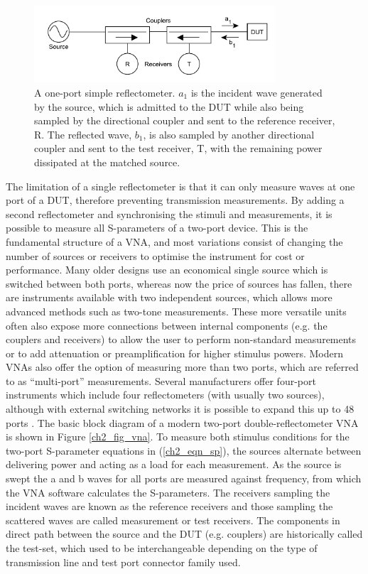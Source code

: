 \documentclass[../thesis/thesis.tex]{subfiles}
\begin{document}
\begin{figure}
	\centering
	\includegraphics[width=0.8\textwidth]{ch2_reflect}
	\caption[Structure of a one-port reflectometer.]{A one-port simple reflectometer. $a_1$ is the incident wave generated by the source, which is admitted to the DUT while also being sampled by the directional coupler and sent to the reference receiver, R. The reflected wave, $b_1$, is also sampled by another directional coupler and sent to the test receiver, T, with the remaining power dissipated at the matched source.}
	\label{ch2_fig_refl}
\end{figure}

The limitation of a single reflectometer is that it can only measure waves at one port of a DUT, therefore preventing transmission measurements. By adding a second reflectometer and synchronising the stimuli and measurements, it is possible to measure all S-parameters of a two-port device. This is the fundamental structure of a VNA, and most variations consist of changing the number of sources or receivers to optimise the instrument for cost or performance. Many older designs use an economical single source which is switched between both ports, whereas now the price of sources has fallen, there are instruments available with two independent sources, which allows more advanced methods such as two-tone measurements. These more versatile units often also expose more  connections between internal components (e.g. the couplers and receivers) to allow the user to perform non-standard measurements or to add attenuation or preamplification for higher stimulus powers.
Modern VNAs also offer the option of measuring more than two ports, which are referred to as “multi-port” measurements. Several manufacturers offer four-port instruments which include four reflectometers (with usually two sources), although with external switching networks it is possible to expand this up to 48 ports \cite{mj_multiport}.
The basic block diagram of a modern two-port double-reflectometer VNA is shown in Figure \ref{ch2_fig_vna}. To measure both stimulus conditions for the two-port S-parameter equations in (\ref{ch2_eqn_sp}), the sources alternate between delivering power and acting as a load for each measurement. As the source is swept the a and b waves for all ports are measured against frequency, from which the VNA software calculates the S-parameters. The receivers sampling the incident waves are known as the reference receivers and those sampling the scattered waves are called measurement or test receivers. The components in direct path between the source and the DUT (e.g. couplers) are historically called the test-set, which used to be interchangeable depending on the type of transmission line and test port connector family used.
\end{document}
